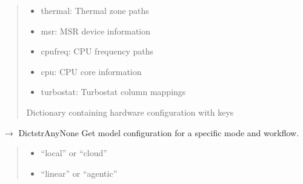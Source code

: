 \documentclass[letterpaper,10pt,english]{sphinxmanual}
\begin{document}
\begin{fulllineitems}
\begin{fulllineitems}
\begin{quote}
\begin{description}
\begin{itemize}
\item {} 
\sphinxAtStartPar
thermal: Thermal zone paths

\item {} 
\sphinxAtStartPar
msr: MSR device information

\item {} 
\sphinxAtStartPar
cpufreq: CPU frequency paths

\item {} 
\sphinxAtStartPar
cpu: CPU core information

\item {} 
\sphinxAtStartPar
turbostat: Turbostat column mappings

\end{itemize}


\sphinxAtStartPar
Dictionary containing hardware configuration with keys

\end{description}\end{quote}

\end{fulllineitems}


\begin{fulllineitems}
\label{\detokenize{core.config_loader:core.config_loader.ConfigLoader.get_model_config}}
\pysigstartsignatures
\pysiglinewithargsret
{}
{\sphinxparamcomma {}}
{{ $\rightarrow$ Dict\DUrole{p}{{[}}strAny\DUrole{p}{{]}}None}}
\pysigstopsignatures
\sphinxAtStartPar
Get model configuration for a specific mode and workflow.
\begin{quote}\begin{description}
\begin{itemize}
\item {} 
\sphinxAtStartPar
{} \textendash{} “local” or “cloud”

\item {} 
\sphinxAtStartPar
{} \textendash{} “linear” or “agentic”


\end{itemize}
\end{description}
\end{quote}
\end{fulllineitems}
\end{fulllineitems}
\end{document}
